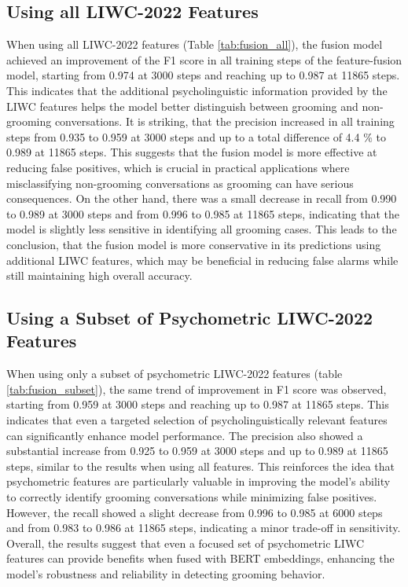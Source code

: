 \subsection{Using all LIWC-2022 Features}

When using all LIWC-2022 features (Table \ref{tab:fusion_all}), the fusion model achieved an improvement of the F1 score in all training steps of the feature-fusion model, starting from 0.974 at 3000 steps and reaching up to 0.987 at 11865 steps. This indicates that the additional psycholinguistic information provided by the LIWC features helps the model better distinguish between grooming and non-grooming conversations. It is striking, that the precision increased in all training steps from 0.935 to 0.959 at 3000 steps and up to a total difference of 4.4 \% to 0.989 at 11865 steps. This suggests that the fusion model is more effective at reducing false positives, which is crucial in practical applications where misclassifying non-grooming conversations as grooming can have serious consequences. On the other hand, there was a small decrease in recall from 0.990 to 0.989 at 3000 steps and from 0.996 to 0.985 at 11865 steps, indicating that the model is slightly less sensitive in identifying all grooming cases. This leads to the conclusion, that the fusion model is more conservative in its predictions using additional LIWC features, which may be beneficial in reducing false alarms while still maintaining high overall accuracy.


\subsection{Using a Subset of Psychometric LIWC-2022 Features}

When using only a subset of psychometric LIWC-2022 features (table \ref{tab:fusion_subset}), the same trend of improvement in F1 score was observed, starting from 0.959 at 3000 steps and reaching up to 0.987 at 11865 steps. This indicates that even a targeted  selection of psycholinguistically relevant features can significantly enhance model performance. The precision also showed a substantial increase from 0.925 to 0.959 at 3000 steps and up to 0.989 at 11865 steps, similar to the results when using all features. This reinforces the idea that psychometric features are particularly valuable in improving the model's ability to correctly identify grooming conversations while minimizing false positives. However, the recall showed a slight decrease from 0.996 to 0.985 at 6000 steps and from 0.983 to 0.986 at 11865 steps, indicating a minor trade-off in sensitivity. Overall, the results suggest that even a focused set of psychometric LIWC features can provide benefits when fused with BERT embeddings, enhancing the model's robustness and reliability in detecting grooming behavior.


